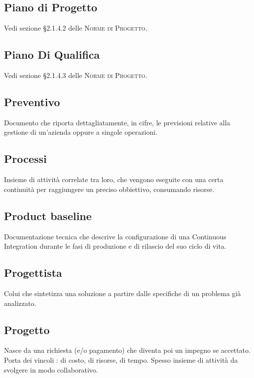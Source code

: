 \documentclass[../glossario.tex]{subfiles}
\begin{document}
\subsection*{Piano di Progetto}
{}
Vedi sezione \S2.1.4.2 delle \textsc{Norme di Progetto}.

\subsection*{Piano Di Qualifica}
{}
Vedi sezione \S2.1.4.3 delle \textsc{Norme di Progetto}.

\subsection*{Preventivo}
{}
Documento che riporta dettagliatamente, in cifre, le previsioni relative alla gestione di un'azienda oppure a singole operazioni.

\subsection*{Processi}
{}
Insieme di attività correlate tra loro, che vengono eseguite con una certa continuità per raggiungere un preciso obbiettivo, consumando risorse.

\subsection*{Product baseline}
{}
Documentazione tecnica che descrive la configurazione di una Continuous Integration durante le fasi di produzione e di rilascio del suo ciclo di vita.

\subsection*{Progettista}
{}
Colui che sintetizza una soluzione a partire dalle specifiche di un problema già analizzato.

\subsection*{Progetto}
{}
Nasce da una richiesta (e/o pagamento) che diventa poi un impegno se accettato. Porta dei vincoli : di costo, di risorse, di tempo. Spesso insieme di attività da svolgere in modo collaborativo.
\end{document}
